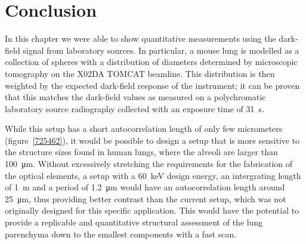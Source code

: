 \section{Conclusion}
In this chapter we were able to show quantitative measurements using the
dark-field signal from laboratory sources. In particular, a mouse lung is
modelled as a collection of spheres with a distribution of diameters determined
by microscopic tomography on the X02DA TOMCAT beamline. This distribution is
then weighted by the expected dark-field response of the instrument; it can
be proven that this matches the dark-field values as measured on a
polychromatic laboratory source radiography collected with an exposure time
of \SI{31}{\second}.

While this setup has a short autocorrelation length of only few micrometers
(figure~\ref{725462}), it would be possible to design a setup that is more
sensitive to the structure sizes found in human lungs, where the alveoli are
larger than \SI{100}{\micro\meter}. Without excessively stretching the
requirements for the fabrication of the optical elements, a setup with a
\SI{60}{\kilo\eV} design energy, an intergrating length of \SI{1}{\meter}
and a period of \SI{1.2}{\micro\meter} would have an autocorrelation length
around \SI{25}{\micro\meter}, thus providing better contrast than the
current setup, which was not originally designed for this specific application.
This would have the potential to provide a replicable and quantitative
structural assessment of the lung parenchyma down to the smallest components
with a fast scan.
